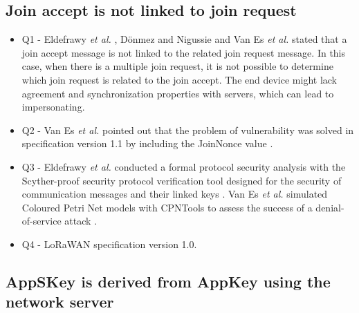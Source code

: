 \documentclass[manuscript,screen,review=false]{acmart}
\begin{document}
\subsection{Join accept is not linked to join request}

\begin{itemize}
\item Q1 - Eldefrawy {\it et al.} \cite{01_formal_security_analysis_LoRaWAN}, D\"onmez and Nigussie \cite{03_security_LoRaWANv1.1_scenarios} and Van Es {\it et al.} \cite{92_DoS_lorawan} stated that a join accept message is not linked to the related join request message. In this case, when there is a multiple join request, it is not possible to determine which join request is related to the join accept. The end device might lack agreement and synchronization properties with servers, which can lead to impersonating.

\item Q2 - Van Es {\it et al.} pointed out that the problem of vulnerability was solved in specification version 1.1 by including the JoinNonce value \cite{92_DoS_lorawan}.

\item Q3 - Eldefrawy {\it et al.} conducted a formal protocol security analysis with the Scyther-proof security protocol verification tool designed for the security of communication messages and their linked keys \cite{01_formal_security_analysis_LoRaWAN}. Van Es {\it et al.} simulated Coloured Petri Net models with CPNTools to assess the success of a denial-of-service attack \cite{92_DoS_lorawan}. 

\item Q4 - LoRaWAN specification version 1.0.
\end{itemize}

\subsection{AppSKey is derived from AppKey using the network server}
\end{document}
